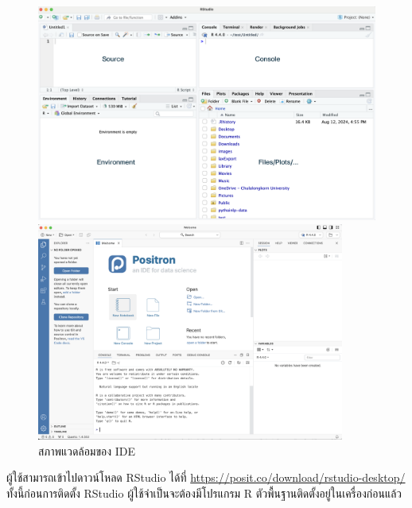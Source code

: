 \documentclass[
  a4paper,
]{book}
\begin{document}
\begin{figure}

\begin{minipage}{0.50\linewidth}

\includegraphics{img/01Rstudio.png}

\end{minipage}%
%
\begin{minipage}{0.50\linewidth}

\includegraphics[width=0.9\textwidth,height=\textheight]{img/01Positron.png}

\end{minipage}%

\caption{\label{fig-IDE}สภาพแวดล้อมของ IDE}

\end{figure}%

ผู้ใช้สามารถเข้าไปดาวน์โหลด RStudio ได้ที่
\url{https://posit.co/download/rstudio-desktop/} ทั้งนี้ก่อนการติดตั้ง RStudio
ผู้ใช้จำเป็นจะต้องมีโปรแกรม R ตัวพื้นฐานติดตั้งอยู่ในเครื่องก่อนแล้ว
\end{document}
